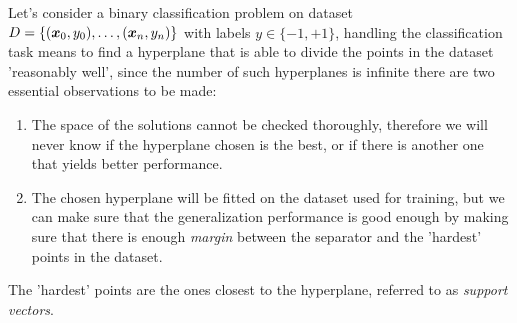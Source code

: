 \medskip

Let's consider a binary classification problem on dataset $D = \{(\boldsymbol{x}_0, y_0), \ldots, (\boldsymbol{x}_n, y_n)\}$ with labels $y \in \{-1, +1\}$,
handling the classification task means to find a hyperplane that is able to divide the points in the
dataset 'reasonably well', since the number of such hyperplanes is infinite there are two
essential observations to be made:
\begin{enumerate}
	\item The space of the solutions cannot be checked thoroughly, therefore we will never know
	      if the hyperplane chosen is the best, or if there is another one that yields better
	      performance.
	\item The chosen hyperplane will be fitted on the dataset used for training,
	      but we can make sure that the generalization performance is good enough by making
	      sure that there is enough \emph{margin} between the separator and the 'hardest'
	      points in the dataset.
\end{enumerate}
The 'hardest' points are the ones closest to the hyperplane, referred to as \emph{support
	vectors}.

\medskip

